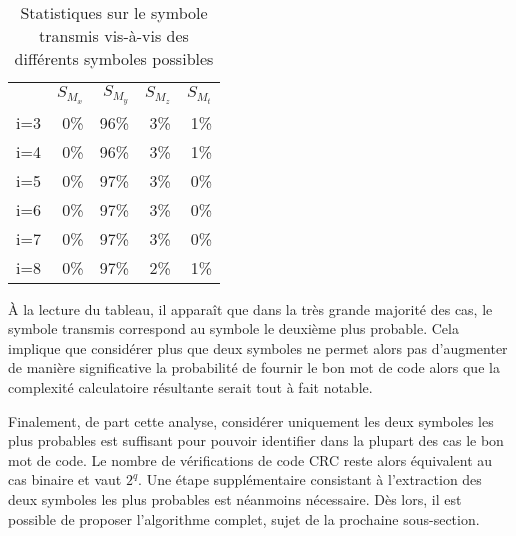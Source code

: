 \begin{table}[!tb]
    \centering
    \caption{Statistiques sur le symbole transmis vis-à-vis des différents symboles possibles}
    \label{tab:symb}
        \begin{tabular}{lrrrr}
            \toprule
            		& $S_{M_x}$	& $S_{M_y}$	& $S_{M_z}$ & $S_{M_t}$ \\
            \cmidrule(l){2-2}\cmidrule(l){3-3}\cmidrule(l){4-4}\cmidrule(l){5-5}
            i=3     &	0\%		&	96\%	& 	3\%		&	1\%		\\
            i=4     &	0\%		&	96\%	& 	3\%		&	1\%		\\
            i=5     &	0\%		&	97\%	& 	3\%		&	0\%		\\
            i=6     &	0\%		&	97\%	& 	3\%		&	0\%		\\
            i=7     &	0\%		&	97\%	& 	3\%		&	0\%		\\
            i=8     &	0\%		&	97\%	& 	2\%		&	1\%	\\
            \bottomrule
        \end{tabular}%
\end{table}
 
À la lecture du tableau, il apparaît que dans la très grande majorité des cas, le symbole transmis 
correspond au symbole le deuxième plus probable. Cela implique que considérer plus que deux symboles ne 
permet alors pas d'augmenter de manière significative la probabilité de fournir le bon mot de code alors que la complexité 
calculatoire résultante serait tout à fait notable.

Finalement, de part cette analyse, considérer uniquement les deux symboles les plus probables est suffisant pour 
pouvoir identifier dans la plupart des cas le bon mot de code. Le nombre de vérifications de code CRC reste alors 
équivalent au cas binaire et vaut $2^q$. Une étape supplémentaire consistant à l'extraction des deux symboles les plus probables est néanmoins 
nécessaire. Dès lors, il est possible de proposer l'algorithme complet, sujet de la prochaine sous-section.

